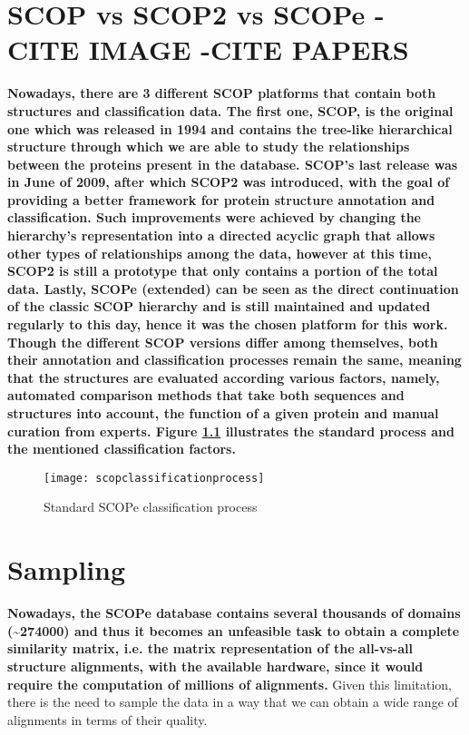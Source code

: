 \chapter{SCOP vs SCOP2 vs SCOPe - CITE IMAGE -CITE PAPERS}

\textbf{Nowadays, there are 3 different SCOP platforms that contain both structures and classification data. The first one, SCOP, is the original one which was released in 1994 and contains the tree-like hierarchical structure through which we are able to study the relationships between the proteins present in the database. SCOP's last release was in June of 2009, after which SCOP2 was introduced, with the goal of providing a better framework for protein structure annotation and classification. Such improvements were achieved by changing the hierarchy's representation into a directed acyclic graph that allows other types of relationships among the data, however at this time, SCOP2 is still a prototype that only contains a portion of the total data. Lastly, SCOPe (extended) can be seen as the direct continuation of the classic SCOP hierarchy and is still maintained and updated regularly to this day, hence it was the chosen platform for this work. Though the different SCOP versions differ among themselves, both their annotation and classification processes remain the same, meaning that the structures are evaluated according various factors, namely, automated comparison methods that take both sequences and structures into account, the function of a given protein and manual curation from experts. Figure \ref{fig:scopclassificationprocess} illustrates the standard process and the mentioned classification factors.}

\begin{figure}[htbp]
	\centering
	\texttt{[image: scopclassificationprocess]}
	\caption{Standard SCOPe classification process}
	\label{fig:scopclassificationprocess}
\end{figure}

\chapter{Sampling}

\textbf{Nowadays, the SCOPe database contains several thousands of domains (\textasciitilde 274000) and thus it becomes an unfeasible task to obtain a complete similarity matrix, i.e. the matrix representation of the all-vs-all structure alignments, with the available hardware, since it would require the computation of millions of alignments.} Given this limitation, there is the need to sample the data in a way that we can obtain a wide range of alignments in terms of their quality. 

